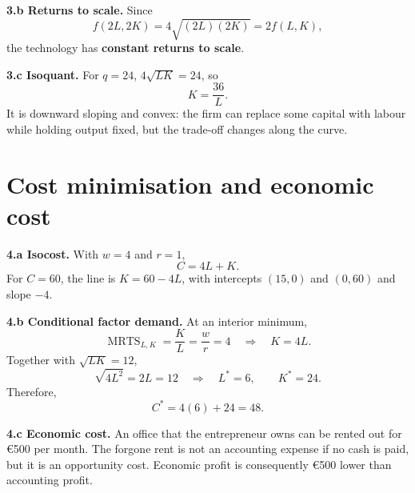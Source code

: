 \documentclass[11pt,a4paper]{article}
\newcommand{\MRTS}{\operatorname{MRTS}}
\begin{document}
\textbf{3.b Returns to scale.} Since
\[
f(2L,2K)=4\sqrt{(2L)(2K)}=2f(L,K),
\]
the technology has \textbf{constant returns to scale}.

\textbf{3.c Isoquant.} For \(q=24\), \(4\sqrt{LK}=24\), so
\[
\boxed{K=\frac{36}{L}}.
\]
It is downward sloping and convex: the firm can replace some capital with
labour while holding output fixed, but the trade-off changes along the curve.

\begin{center}
\end{center}

\section{Cost minimisation and economic cost}

\textbf{4.a Isocost.} With \(w=4\) and \(r=1\),
\[
C=4L+K.
\]
For \(C=60\), the line is \(K=60-4L\), with intercepts \((15,0)\) and
\((0,60)\) and slope \(-4\).

\textbf{4.b Conditional factor demand.} At an interior minimum,
\[
\MRTS_{L,K}=\frac{K}{L}=\frac{w}{r}=4
\quad\Longrightarrow\quad K=4L.
\]
Together with \(\sqrt{LK}=12\),
\[
\sqrt{4L^2}=2L=12
\quad\Longrightarrow\quad
\boxed{L^*=6,\qquad K^*=24}.
\]
Therefore,
\[
C^*=4(6)+24=\boxed{48}.
\]

\textbf{4.c Economic cost.} An office that the entrepreneur owns can be rented
out for \euro500 per month. The forgone rent is not an accounting expense if no
cash is paid, but it is an opportunity cost. Economic profit is consequently
\euro500 lower than accounting profit.
\end{document}
